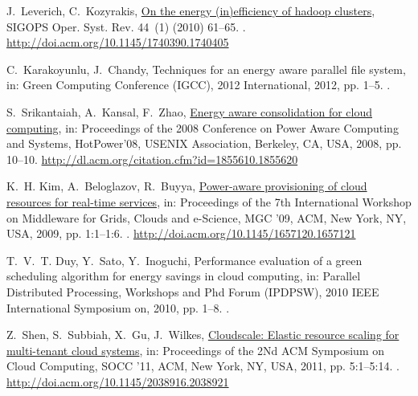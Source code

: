 \documentclass[preprint,12pt]{elsarticle}
\begin{document}
\begin{thebibliography}{10}
J.~Leverich, C.~Kozyrakis, \href{http://doi.acm.org/10.1145/1740390.1740405}{On
  the energy (in)efficiency of hadoop clusters}, SIGOPS Oper. Syst. Rev. 44~(1)
  (2010) 61--65.
\newblock \href {http://dx.doi.org/10.1145/1740390.1740405}
  {}.
\newline\urlprefix\url{http://doi.acm.org/10.1145/1740390.1740405}

C.~Karakoyunlu, J.~Chandy, Techniques for an energy aware parallel file system,
  in: Green Computing Conference (IGCC), 2012 International, 2012, pp. 1--5.
\newblock \href {http://dx.doi.org/10.1109/IGCC.2012.6322247}
  {}.

S.~Srikantaiah, A.~Kansal, F.~Zhao,
  \href{http://dl.acm.org/citation.cfm?id=1855610.1855620}{Energy aware
  consolidation for cloud computing}, in: Proceedings of the 2008 Conference on
  Power Aware Computing and Systems, HotPower'08, USENIX Association, Berkeley,
  CA, USA, 2008, pp. 10--10.
\newline\urlprefix\url{http://dl.acm.org/citation.cfm?id=1855610.1855620}

K.~H. Kim, A.~Beloglazov, R.~Buyya,
  \href{http://doi.acm.org/10.1145/1657120.1657121}{Power-aware provisioning of
  cloud resources for real-time services}, in: Proceedings of the 7th
  International Workshop on Middleware for Grids, Clouds and e-Science, MGC
  '09, ACM, New York, NY, USA, 2009, pp. 1:1--1:6.
\newblock \href {http://dx.doi.org/10.1145/1657120.1657121}
  {}.
\newline\urlprefix\url{http://doi.acm.org/10.1145/1657120.1657121}

T.~V.~T. Duy, Y.~Sato, Y.~Inoguchi, Performance evaluation of a green
  scheduling algorithm for energy savings in cloud computing, in: Parallel
  Distributed Processing, Workshops and Phd Forum (IPDPSW), 2010 IEEE
  International Symposium on, 2010, pp. 1--8.
\newblock \href {http://dx.doi.org/10.1109/IPDPSW.2010.5470908}
  {}.

Z.~Shen, S.~Subbiah, X.~Gu, J.~Wilkes,
  \href{http://doi.acm.org/10.1145/2038916.2038921}{Cloudscale: Elastic
  resource scaling for multi-tenant cloud systems}, in: Proceedings of the 2Nd
  ACM Symposium on Cloud Computing, SOCC '11, ACM, New York, NY, USA, 2011, pp.
  5:1--5:14.
\newblock \href {http://dx.doi.org/10.1145/2038916.2038921}
  {}.
\newline\urlprefix\url{http://doi.acm.org/10.1145/2038916.2038921}


\end{thebibliography}
\end{document}

